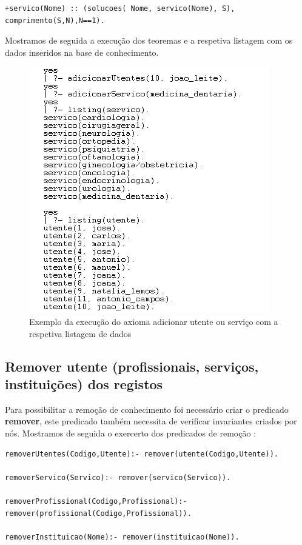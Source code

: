 \begin{Verbatim}
+servico(Nome) :: (solucoes( Nome, servico(Nome), S),
comprimento(S,N),N==1). 
\end{Verbatim}

Mostramos de seguida a execução dos teoremas e a respetiva listagem com os dados inseridos na base de conhecimento. 

\begin{figure}[<+htpb+>]
	\centering
	\includegraphics[scale=0.9]{answer9.png}
	\caption{Exemplo da execução do axioma adicionar utente ou serviço com a respetiva listagem de dados}
	\label{p3:fig:output9}
\end{figure}

\subsection{Remover utente (profissionais, serviços, instituições) dos registos}

Para possibilitar a remoção de conhecimento foi necessário criar o predicado \textbf{remover}, este predicado também necessita de verificar invariantes criados por nós. Mostramos de seguida o exercerto dos predicados de remoção :

\begin{Verbatim}
removerUtentes(Codigo,Utente):- remover(utente(Codigo,Utente)).

removerServico(Servico):- remover(servico(Servico)).

removerProfissional(Codigo,Profissional):- remover(profissional(Codigo,Profissional)).

removerInstituicao(Nome):- remover(instituicao(Nome)).
\end{Verbatim}

